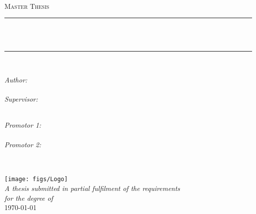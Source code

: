 \documentclass[12pt, oneside]{Thesis} %
\title{\ttitle} %
\newcommand{\HRule}{\rule{\linewidth}{0.5mm}} %
\begin{document}
\begin{titlepage}
\begin{center}

\textsc{\LARGE \univname}\\[1.5cm] %
\textsc{\Large Master Thesis}\\[0.5cm] %

\HRule \\[0.4cm] %
{\fontsize{22.5}{26} \bfseries \ttitle}\\%

\HRule \\[1.5cm] %
 
\begin{minipage}{0.48\textwidth}
\begin{flushleft} \large
\emph{Author:}\\
{\authornames}  \\%
\emph{Supervisor:} \\
\supname \\
\end{flushleft}
\end{minipage}
\begin{minipage}{0.48\textwidth}
\begin{flushright} \large
\emph{Promotor 1:} \\
\examname \\
\emph{Promotor 2:} \\
\examnames \\
\end{flushright}
\end{minipage}\\[3.5cm]

\texttt{[image: figs/Logo]}\\[2cm] %

\large \textit{A thesis submitted in partial fulfilment of the requirements\\ for the degree of \degreename}\\[0.3cm] %
 
{\large \today}\\[4cm] %

 
\vfill
\end{center}
\end{titlepage}
\end{document}
